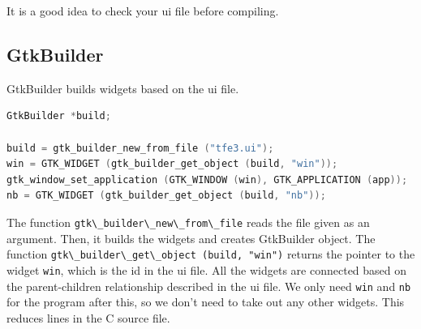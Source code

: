 It is a good idea to check your ui file before compiling.

\hypertarget{gtkbuilder}{%
\subsection{GtkBuilder}\label{gtkbuilder}}

GtkBuilder builds widgets based on the ui file.

\begin{lstlisting}[language=C]
GtkBuilder *build;

build = gtk_builder_new_from_file ("tfe3.ui");
win = GTK_WIDGET (gtk_builder_get_object (build, "win"));
gtk_window_set_application (GTK_WINDOW (win), GTK_APPLICATION (app));
nb = GTK_WIDGET (gtk_builder_get_object (build, "nb"));
\end{lstlisting}

The function \passthrough{\lstinline!gtk\_builder\_new\_from\_file!}
reads the file given as an argument. Then, it builds the widgets and
creates GtkBuilder object. The function
\passthrough{\lstinline!gtk\_builder\_get\_object (build, "win")!}
returns the pointer to the widget \passthrough{\lstinline!win!}, which
is the id in the ui file. All the widgets are connected based on the
parent-children relationship described in the ui file. We only need
\passthrough{\lstinline!win!} and \passthrough{\lstinline!nb!} for the
program after this, so we don't need to take out any other widgets. This
reduces lines in the C source file.

